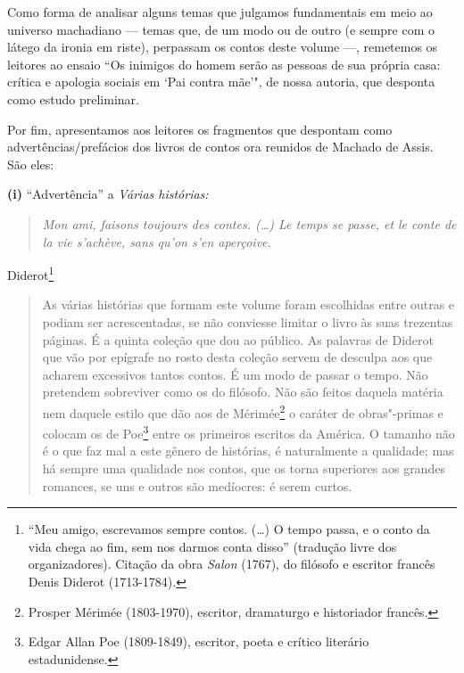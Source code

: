 Como forma de analisar alguns temas que julgamos fundamentais em meio ao
universo machadiano --- temas que, de um modo ou de outro (e sempre com o
látego da ironia em riste), perpassam os contos deste volume ---,
remetemos os leitores ao ensaio ``Os inimigos do homem serão as pessoas
de sua própria casa: crítica e apologia sociais em `Pai contra mãe'",
de nossa autoria, que desponta como estudo preliminar.

Por fim, apresentamos aos leitores os fragmentos que despontam como
advertências/prefácios dos livros de contos ora reunidos de Machado de
Assis. São eles:

\pagebreak

\textbf{(i)} ``Advertência'' a \emph{Várias histórias: }
\begin{quote}
\emph{Mon ami, faisons toujours des contes. (\ldots{}) Le temps se passe, et
le conte de la vie s'achève, sans qu'on s'en aperçoive. }
\end{quote}

\begin{flushright}
Diderot\footnote{``Meu amigo, escrevamos sempre contos. (\ldots{}) O tempo
  passa, e o conto da vida chega ao fim, sem nos darmos conta disso''
  (tradução livre dos organizadores). Citação da obra \emph{Salon}
  (1767), do filósofo e escritor francês Denis Diderot (1713-1784).}
 \end{flushright}

\begin{quote}
As várias histórias que formam este volume foram escolhidas entre outras
e podiam ser acrescentadas, se não conviesse limitar o livro às suas
trezentas páginas. É a quinta coleção que dou ao público. As palavras de
Diderot que vão por epígrafe no rosto desta coleção servem de desculpa
aos que acharem excessivos tantos contos. É um modo de passar o tempo.
Não pretendem sobreviver como os do filósofo. Não são feitos daquela
matéria nem daquele estilo que dão aos de Mérimée\footnote{Prosper
  Mérimée (1803-1970), escritor, dramaturgo e historiador francês.} o
caráter de obras"-primas e colocam os de Poe\footnote{Edgar Allan Poe
  (1809-1849), escritor, poeta e crítico literário estadunidense.} entre
os primeiros escritos da América. O tamanho não é o que faz mal a este
gênero de histórias, é naturalmente a qualidade; mas há sempre uma
qualidade nos contos, que os torna superiores aos grandes romances, se
uns e outros são medíocres: é serem curtos.
\end{quote}

\bigskip

